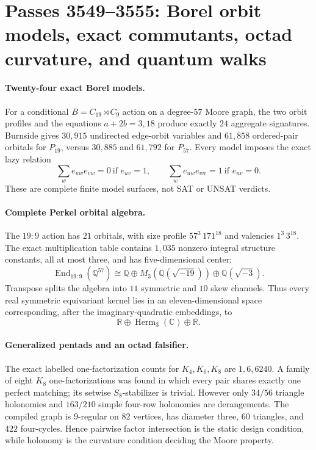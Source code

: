 \section{Passes 3549--3555: Borel orbit models, exact commutants, octad curvature, and quantum walks}

\paragraph{Twenty-four exact Borel models.}
For a conditional \(B=C_{19}\rtimes C_9\) action on a degree-\(57\) Moore graph, the two orbit profiles and the equations \(a+2b=3,18\) produce exactly \(24\) aggregate signatures. Burnside gives \(30{,}915\) undirected edge-orbit variables and \(61{,}858\) ordered-pair orbitals for \(P_{19}\), versus \(30{,}885\) and \(61{,}792\) for \(P_{57}\). Every model imposes the exact lazy relation
\[
\sum_w e_{uw}e_{vw}=0\ \text{if }e_{uv}=1,
\qquad
\sum_w e_{uw}e_{vw}=1\ \text{if }e_{uv}=0.
\]
These are complete finite model surfaces, not SAT or UNSAT verdicts.

\paragraph{Complete Perkel orbital algebra.}
The \(19{:}9\) action has \(21\) orbitals, with size profile \(57^3\,171^{18}\) and valencies \(1^3\,3^{18}\). The exact multiplication table contains \(1{,}035\) nonzero integral structure constants, all at most three, and has five-dimensional center:
\[
\operatorname{End}_{19{:}9}(\mathbb Q^{57})
\cong
\mathbb Q\oplus M_3(\mathbb Q(\sqrt{-19}))\oplus\mathbb Q(\sqrt{-3}).
\]
Transpose splits the algebra into \(11\) symmetric and \(10\) skew channels. Thus every real symmetric equivariant kernel lies in an eleven-dimensional space corresponding, after the imaginary-quadratic embeddings, to
\[
\mathbb R\oplus\operatorname{Herm}_3(\mathbb C)\oplus\mathbb R.
\]

\paragraph{Generalized pentads and an octad falsifier.}
The exact labelled one-factorization counts for \(K_4,K_6,K_8\) are \(1,6,6240\). A family of eight \(K_8\) one-factorizations was found in which every pair shares exactly one perfect matching; its setwise \(S_8\)-stabilizer is trivial. However only \(34/56\) triangle holonomies and \(163/210\) simple four-row holonomies are derangements. The compiled graph is \(9\)-regular on \(82\) vertices, has diameter three, \(60\) triangles, and \(422\) four-cycles. Hence pairwise factor intersection is the static design condition, while holonomy is the curvature condition deciding the Moore property.

